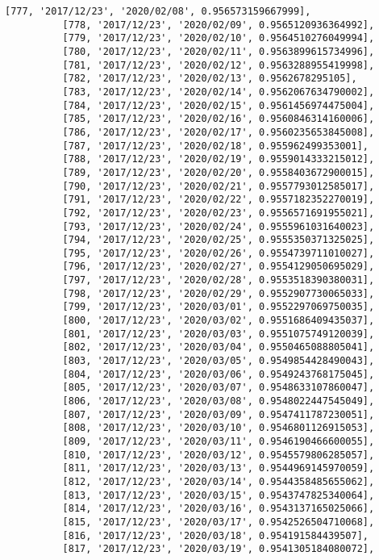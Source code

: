 \documentclass[11pt]{article}
\begin{document}
\begin{Verbatim}[commandchars=\\\{\}]
          [777, '2017/12/23', '2020/02/08', 0.956573159667999],
          [778, '2017/12/23', '2020/02/09', 0.9565120936364992],
          [779, '2017/12/23', '2020/02/10', 0.9564510276049994],
          [780, '2017/12/23', '2020/02/11', 0.9563899615734996],
          [781, '2017/12/23', '2020/02/12', 0.9563288955419998],
          [782, '2017/12/23', '2020/02/13', 0.9562678295105],
          [783, '2017/12/23', '2020/02/14', 0.9562067634790002],
          [784, '2017/12/23', '2020/02/15', 0.9561456974475004],
          [785, '2017/12/23', '2020/02/16', 0.9560846314160006],
          [786, '2017/12/23', '2020/02/17', 0.9560235653845008],
          [787, '2017/12/23', '2020/02/18', 0.955962499353001],
          [788, '2017/12/23', '2020/02/19', 0.9559014333215012],
          [789, '2017/12/23', '2020/02/20', 0.9558403672900015],
          [790, '2017/12/23', '2020/02/21', 0.9557793012585017],
          [791, '2017/12/23', '2020/02/22', 0.9557182352270019],
          [792, '2017/12/23', '2020/02/23', 0.9556571691955021],
          [793, '2017/12/23', '2020/02/24', 0.9555961031640023],
          [794, '2017/12/23', '2020/02/25', 0.9555350371325025],
          [795, '2017/12/23', '2020/02/26', 0.9554739711010027],
          [796, '2017/12/23', '2020/02/27', 0.9554129050695029],
          [797, '2017/12/23', '2020/02/28', 0.9553518390380031],
          [798, '2017/12/23', '2020/02/29', 0.9552907730065033],
          [799, '2017/12/23', '2020/03/01', 0.9552297069750035],
          [800, '2017/12/23', '2020/03/02', 0.9551686409435037],
          [801, '2017/12/23', '2020/03/03', 0.9551075749120039],
          [802, '2017/12/23', '2020/03/04', 0.9550465088805041],
          [803, '2017/12/23', '2020/03/05', 0.9549854428490043],
          [804, '2017/12/23', '2020/03/06', 0.9549243768175045],
          [805, '2017/12/23', '2020/03/07', 0.9548633107860047],
          [806, '2017/12/23', '2020/03/08', 0.9548022447545049],
          [807, '2017/12/23', '2020/03/09', 0.9547411787230051],
          [808, '2017/12/23', '2020/03/10', 0.9546801126915053],
          [809, '2017/12/23', '2020/03/11', 0.9546190466600055],
          [810, '2017/12/23', '2020/03/12', 0.9545579806285057],
          [811, '2017/12/23', '2020/03/13', 0.9544969145970059],
          [812, '2017/12/23', '2020/03/14', 0.9544358485655062],
          [813, '2017/12/23', '2020/03/15', 0.9543747825340064],
          [814, '2017/12/23', '2020/03/16', 0.9543137165025066],
          [815, '2017/12/23', '2020/03/17', 0.9542526504710068],
          [816, '2017/12/23', '2020/03/18', 0.954191584439507],
          [817, '2017/12/23', '2020/03/19', 0.9541305184080072],

\end{Verbatim}
\end{document}
